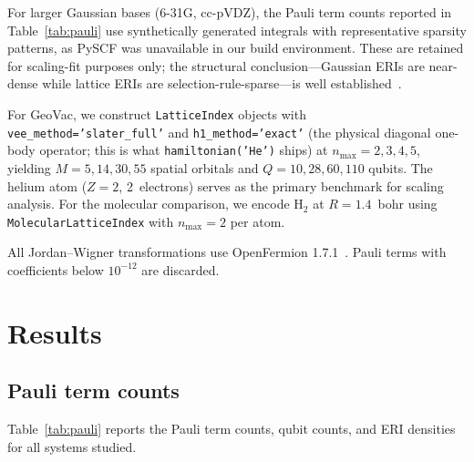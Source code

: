 \documentclass[aps,pra,twocolumn,superscriptaddress,longbibliography]{revtex4-2}
\begin{document}
For larger Gaussian bases (6-31G, cc-pVDZ), the Pauli term counts
reported in Table~\ref{tab:pauli} use synthetically generated integrals
with representative sparsity patterns, as PySCF was unavailable in our
build environment.  These are retained for scaling-fit purposes only;
the structural conclusion---Gaussian ERIs are near-dense while lattice
ERIs are selection-rule-sparse---is well established~\cite{helgaker2000}.

For GeoVac, we construct \texttt{LatticeIndex} objects with
\texttt{vee\_method='slater\_full'} and \texttt{h1\_method='exact'}
(the physical diagonal one-body operator; this is what
\texttt{hamiltonian('He')} ships) at
$n_{\max} = 2, 3, 4, 5$, yielding $M = 5, 14, 30, 55$ spatial orbitals
and $Q = 10, 28, 60, 110$ qubits.  The helium atom ($Z = 2$, 2~electrons)
serves as the primary benchmark for scaling analysis.  For the molecular
comparison, we encode H$_2$ at $R = 1.4$~bohr using
\texttt{MolecularLatticeIndex} with $n_{\max} = 2$ per atom.

All Jordan--Wigner transformations use OpenFermion
1.7.1~\cite{mcclean2020}.  Pauli terms with coefficients below $10^{-12}$
are discarded.


\section{Results}
\label{sec:results}

\subsection{Pauli term counts}
\label{sec:pauli_counts}

Table~\ref{tab:pauli} reports the Pauli term counts, qubit counts, and
ERI densities for all systems studied.
\end{document}
